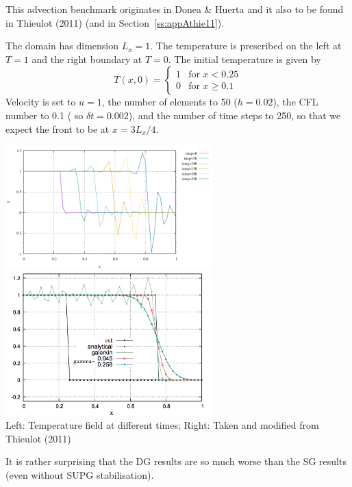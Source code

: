This advection benchmark originates in Donea \& Huerta \cite{dohu03}
and it also to be found in Thieulot (2011) \cite{thie11} (and in 
Section~\ref{ss:appAthie11}).

The domain has dimension $L_x=1$. 
The temperature is prescribed on the left at $T=1$
and the right boundary at $T=0$.
The initial temperature is given by
\[
T(x,0)=
\left\{
\begin{array}{ll}
1 & \textrm{for } x< 0.25 \\
0 & \textrm{for } x\geq 0.1 
\end{array}
\right.
\]
Velocity is set to $u=1$, the number of elements to 50 ($h=0.02$), the CFL number to 0.1 (
so $\delta t=0.002$), and the number of time steps to 250, so that we expect the front
to be at $x=3L_x/4$.  

\begin{center}
\includegraphics[width=8cm]{python_codes/fieldstone_60/results/exp2/T.pdf}\\
\includegraphics[width=8cm]{images/supg/fantom3}\\
{\captionfont Left: Temperature field at different times; 
Right: Taken and modified from Thieulot (2011) \cite{thie11}}
\end{center}

It is rather surprising that the DG results are so much worse than the SG results (even without 
SUPG stabilisation).









